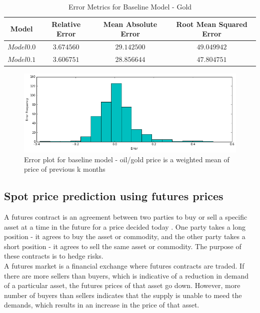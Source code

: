 \documentclass[runningheads]{llncs}
\begin{document}
\begin{table}
\begin{center}
\begin{tabular}{|c|c|c|c|}
\hline
Model & Relative Error & Mean Absolute Error & Root Mean Squared Error \\ \hline
$ Model 0.0 $ & $3.674560$ & $29.142500$ & $49.049942$ \\ \hline
$ Model 0.1 $ & $3.606751$ & $28.856644$ & $47.804751$\\ \hline
\end{tabular}
\end{center}
\caption{Error Metrics for Baseline Model - Gold}
\end{table}


\begin{figure}
\centering
\includegraphics[width=\textwidth]{baseline2_error_histogram.png}
\caption{Error plot for baseline model - oil/gold price is a weighted mean of price of previous k months}
\label{fig:baseline2_error_histogram.png}
\end{figure}

\subsection{Spot price prediction using futures prices}

A futures contract is an agreement between two parties to buy or sell a specific asset at a time in the future for a price decided today \cite{futures_book}. One party takes a long position - it agrees to buy the asset or commodity, and the other party takes a short position - it agrees to sell the same asset or commodity. The purpose of these contracts is to hedge risks.\\

\noindent A futures market is a financial exchange where futures contracts are traded. If there are more sellers than buyers, which is indicative of a reduction in demand of a particular asset, the futures prices of that asset go down. However, more number of buyers than sellers indicates that the supply is unable to meed the demands, which results in an increase in the price of that asset. \\
\end{document}
